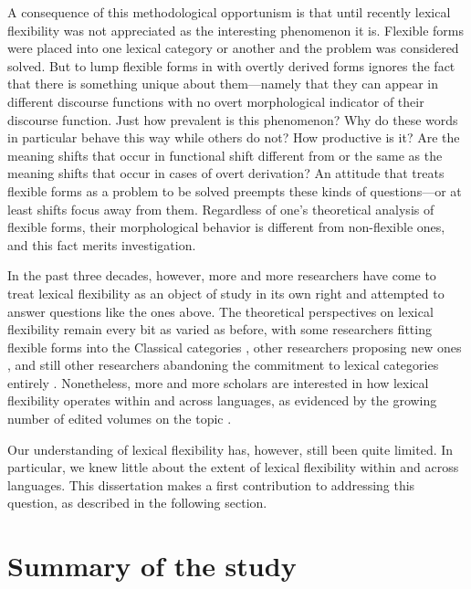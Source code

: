 A consequence of this methodological opportunism is that until recently lexical flexibility was not appreciated as the interesting phenomenon it is. Flexible forms were placed into one lexical category or another and the problem was considered solved. But to lump flexible forms in with overtly derived forms ignores the fact that there is something unique about them—namely that they can appear in different discourse functions with no overt morphological indicator of their discourse function. Just how prevalent is this phenomenon? Why do these words in particular behave this way while others do not? How productive is it? Are the meaning shifts that occur in functional shift different from or the same as the meaning shifts that occur in cases of overt derivation? An attitude that treats flexible forms as a problem to be solved preempts these kinds of questions—or at least shifts focus away from them. Regardless of one's theoretical analysis of flexible forms, their morphological behavior is different from non-flexible ones, and this fact merits investigation.

In the past three decades, however, more and more researchers have come to treat lexical flexibility as an object of study in its own right and attempted to answer questions like the ones above. The theoretical perspectives on lexical flexibility remain every bit as varied as before, with some researchers fitting flexible forms into the Classical categories \parencites{Baker2003}{Dixon2004}{Floyd2011}{Chung2012}{Palmer2017}, other researchers proposing new ones \parencites{HengeveldRijkhoff2005}{Luuk2010}, and still other researchers abandoning the commitment to lexical categories entirely \parencites{Gil1994}{Broschart1997}{Gil2005}. Nonetheless, more and more scholars are interested in how lexical flexibility operates within and across languages, as evidenced by the growing number of edited volumes on the topic \parencites{VogelComrie2000}{LoisVapnarsky2003}{EvansOsada2005}{AnsaldoDonPfau2010}{RijkhoffLier2013}{SimoneMasini2014}{BlaszczakKlimekJankowskaMigdalski2015}{Lier2017}{VapnarskyVeneziano2017a}{VapnarskyVeneziano2017b}{CuyckensHeyvaertHartmann2019}.

Our understanding of lexical flexibility has, however, still been quite limited. In particular, we knew little about the extent of lexical flexibility within and across languages. This dissertation makes a first contribution to addressing this question, as described in the following section.

\section{Summary of the study}
\label{sec:5.2}

